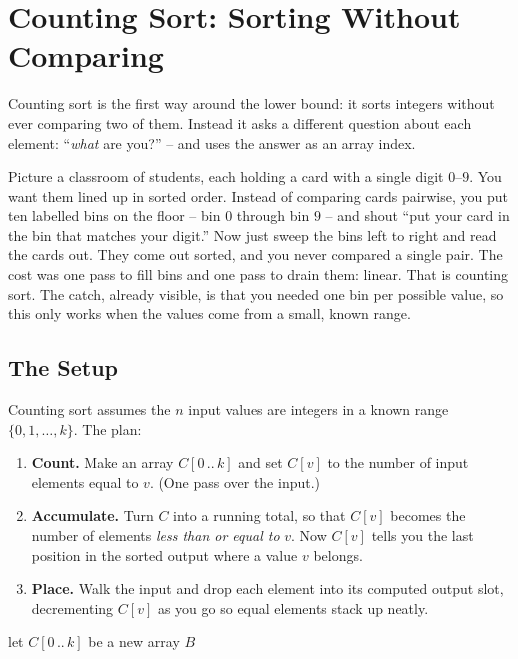 \section{Counting Sort: Sorting Without Comparing}

Counting sort is the first way around the lower bound: it sorts integers without
ever comparing two of them. Instead it asks a different question about each
element: ``\emph{what} are you?'' -- and uses the answer as an array index.

\begin{intuitionbox}
Picture a classroom of students, each holding a card with a single digit
$0$--$9$. You want them lined up in sorted order. Instead of comparing cards
pairwise, you put ten labelled bins on the floor -- bin $0$ through bin $9$ --
and shout ``put your card in the bin that matches your digit.'' Now just sweep
the bins left to right and read the cards out. They come out sorted, and you
never compared a single pair. The cost was one pass to fill bins and one pass
to drain them: linear. That is counting sort. The catch, already visible, is
that you needed one bin per possible value, so this only works when the values
come from a small, known range.
\end{intuitionbox}

\subsection{The Setup}

Counting sort assumes the $n$ input values are integers in a known range
$\{0, 1, \dots, k\}$. The plan:

\begin{enumerate}
\item \textbf{Count.} Make an array $C[0\,..\,k]$ and set $C[v]$ to the number
of input elements equal to $v$. (One pass over the input.)
\item \textbf{Accumulate.} Turn $C$ into a running total, so that $C[v]$ becomes
the number of elements \emph{less than or equal to} $v$. Now $C[v]$ tells you
the last position in the sorted output where a value $v$ belongs.
\item \textbf{Place.} Walk the input and drop each element into its computed
output slot, decrementing $C[v]$ as you go so equal elements stack up neatly.
\end{enumerate}

\begin{algorithm}[H]
\caption{\textsc{Counting-Sort}}
let $C[0\,..\,k]$ be a new array\;
\Return $B$\;
\end{algorithm}

